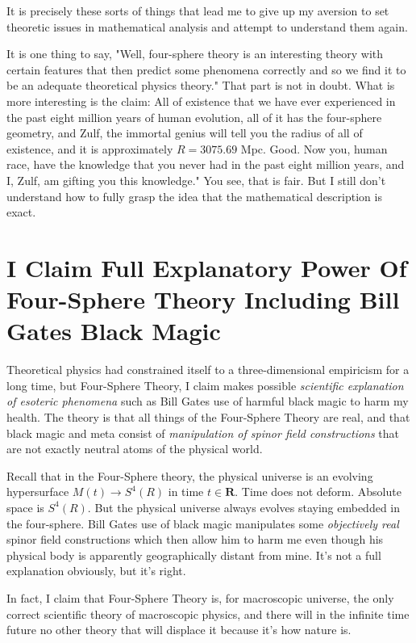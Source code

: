 \documentclass{amsart}
\begin{document}
It is precisely these sorts of things that lead me to give up my aversion to set theoretic issues in mathematical analysis and attempt to understand them again.

It is one thing to say, "Well, four-sphere theory is an interesting theory with certain features that then predict some phenomena correctly and so we find it to be an adequate theoretical physics theory."  That part is not in doubt. What is more interesting is the claim:  All of existence that we have ever experienced in the past eight million years of human evolution, all of it has the four-sphere geometry, and Zulf, the immortal genius will tell you the radius of all of existence, and it is approximately $R=3075.69$ Mpc.  Good.  Now you, human race, have the knowledge that you never had in the past eight million years, and I, Zulf, am gifting you this knowledge."
You see, that is fair.  But I still don't understand how to fully grasp the idea that the mathematical description is exact.

\section{I Claim Full Explanatory Power Of Four-Sphere Theory Including Bill Gates Black Magic}

Theoretical physics had constrained itself to a three-dimensional empiricism for a long time, but Four-Sphere Theory, I claim makes possible {\em scientific explanation of esoteric phenomena} such as Bill Gates use of harmful black magic to harm my health.  The theory is that all things of the Four-Sphere Theory are real, and that black magic and meta consist of {\em manipulation of spinor field constructions} that are not exactly neutral atoms of the physical world.

Recall that in the Four-Sphere theory, the physical universe is an evolving hypersurface $M(t)\rightarrow S^4(R)$ in time $t \in \mathbf{R}$.  Time does not deform.  Absolute space is $S^4(R)$.  But the physical universe always evolves staying embedded in the four-sphere.  Bill Gates use of black magic manipulates some {\em objectively real} spinor field constructions which then allow him to harm me even though his physical body is apparently geographically distant from mine.  It's not a full explanation obviously, but it's right.

In fact, I claim that Four-Sphere Theory is, for macroscopic universe, the only correct scientific theory of macroscopic physics, and there will in the infinite time future no other theory that will displace it because it's how nature is.
\end{document}
